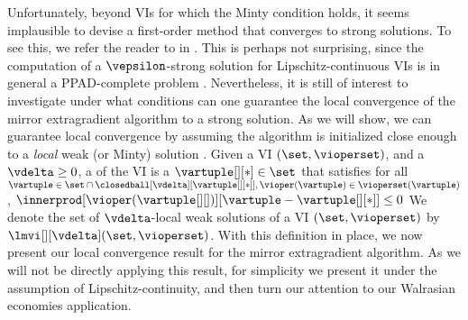 Unfortunately, beyond VIs for which the Minty condition holds, it seems implausible to devise a first-order method that converges to strong solutions. To see this, we refer the reader to  in .
This is perhaps not surprising, since the computation of a $\vepsilon$-strong solution for Lipschitz-continuous VIs is in general a PPAD-complete problem \cite{kapron2024computational}. 
Nevertheless, it is still of interest to investigate under what conditions can one guarantee the local convergence of the mirror extragradient algorithm to a strong solution. As we will show, we can guarantee local convergence by assuming the algorithm is initialized close enough to a \emph{local} weak (or Minty) solution \citet{aussel2024variational}. 
Given a VI $(\set, \vioperset)$, and a  $\vdelta \geq 0$, a  of the VI is a $\vartuple[][*] \in \set$ that satisfies for all $\vartuple \in \set \cap \closedball[\vdelta][{\vartuple[][*]}], \vioper(\vartuple) \in \vioperset(\vartuple)$, $\innerprod[{\vioper(\vartuple[][])}][{\vartuple - \vartuple[][*]}] \leq 0$
We denote the set of $\vdelta$-local weak solutions of a VI $(\set, \vioperset)$ by $\lmvi[][\vdelta](\set, \vioperset)$. With this definition in place, we now present our local convergence result for the mirror extragradient algorithm. As we will not be directly applying this result, for simplicity we present it under the assumption of Lipschitz-continuity, and then turn our attention to our Walrasian economies application.
% 
% 
